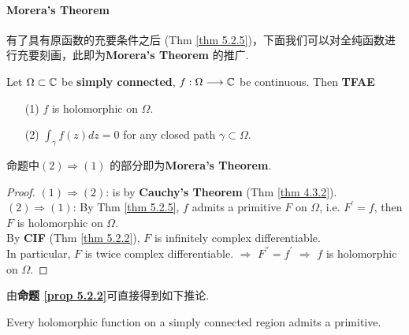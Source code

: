 \vspace{2em}
\paragraph{\textbf{Morera's Theorem}}
有了具有原函数的充要条件之后 (Thm \ref{thm 5.2.5})，下面我们可以对全纯函数进行充要刻画，此即为\textbf{Morera's Theorem} 的推广.

\begin{proposition}\label{prop 5.2.2}
	Let $\Omega \subset \mathbb{C}$ be \textbf{simply connected}, $f : \Omega \longrightarrow \mathbb{C}$ be continuous. Then \textbf{TFAE}
	\begin{enumerate}
		\item[(1)]$f$ is holomorphic on $\Omega$.
		
		\item[(2)]$\int_{\gamma}{f(z) dz} = 0$ for any closed path $\gamma \subset \Omega$. 
	\end{enumerate}
	
	\vspace{1em}
	\begin{rmk}
		命题中$(2) \Rightarrow (1)$ 的部分即为\textbf{Morera's Theorem}.
	\end{rmk}
	
	\vspace{1em}
	\begin{proof}
		$(1) \Rightarrow (2)$: is by \textbf{Cauchy's Theorem} (Thm \ref{thm 4.3.2}). \\
		$(2) \Rightarrow (1)$: By Thm \ref{thm 5.2.5}, $f$ admits a primitive $F$ on $\Omega$, i.e. $F^{'} = f$, then $F$ is holomorphic on $\Omega$. \\
		By \textbf{CIF} (Thm \ref{thm 5.2.2}), $F$ is infinitely complex differentiable. \\
		In particular, $F$ is twice complex differentiable. $\Rightarrow$ $F^{''} = f^{'}$ $\Rightarrow$ $f$ is holomorphic on $\Omega$. 
	\end{proof}
\end{proposition}

\newpage
由\textbf{命题 \ref{prop 5.2.2}}可直接得到如下推论.
\begin{corollary}\label{cor 5.2.6}
	Every holomorphic function on a simply connected region admits a primitive.
\end{corollary}

